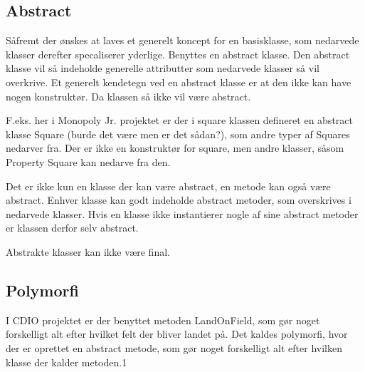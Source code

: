 \documentclass[../main.tex]{subfiles}
\begin{document}
\subsection{Abstract}

Såfremt der ønskes at laves et generelt koncept for en basisklasse, som nedarvede klasser derefter specaliserer yderlige. Benyttes en abstract klasse. Den abstract klasse vil så indeholde generelle attributter som nedarvede klasser så vil overkrive. Et generelt kendetegn ved en abstract klasse er at den ikke kan have nogen konstruktør. Da klassen så ikke vil være abstract. 

F.eks. her i Monopoly Jr. projektet er der i square klassen defineret en abstract klasse Square (burde det være men er det sådan?), som andre typer af Squares nedarver fra. Der er ikke en konstruktør for square, men andre klasser, såsom Property Square kan nedarve fra den. 

Det er ikke kun en klasse der kan være abstract, en metode kan også være abstract. Enhver klasse kan godt indeholde abstract metoder, som overskrives i nedarvede klasser. Hvis en klasse ikke instantierer nogle af sine abstract metoder er klassen derfor selv abstract. 

Abstrakte klasser kan ikke være final.

\subsection{Polymorfi}

I CDIO projektet er der benyttet metoden LandOnField, som gør noget forskelligt alt efter hvilket felt der bliver landet på. Det kaldes polymorfi, hvor der er oprettet en abstract metode, som gør noget forskelligt alt efter hvilken klasse der kalder metoden.1
\end{document}
